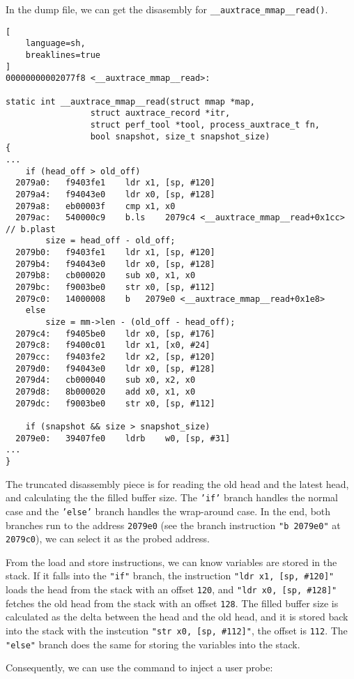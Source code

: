 \documentclass[11pt]{diazessay} %
\def\code#1{\texttt{#1}}
\begin{document}
In the dump file, we can get the disasembly for \code{\_\_auxtrace\_mmap\_\_read()}.

\begin{lstlisting}[
  	language=sh,
	breaklines=true
]
00000000002077f8 <__auxtrace_mmap__read>:

static int __auxtrace_mmap__read(struct mmap *map,
				 struct auxtrace_record *itr,
				 struct perf_tool *tool, process_auxtrace_t fn,
				 bool snapshot, size_t snapshot_size)
{
...
	if (head_off > old_off)
  2079a0:	f9403fe1 	ldr	x1, [sp, #120]
  2079a4:	f94043e0 	ldr	x0, [sp, #128]
  2079a8:	eb00003f 	cmp	x1, x0
  2079ac:	540000c9 	b.ls	2079c4 <__auxtrace_mmap__read+0x1cc>  // b.plast
		size = head_off - old_off;
  2079b0:	f9403fe1 	ldr	x1, [sp, #120]
  2079b4:	f94043e0 	ldr	x0, [sp, #128]
  2079b8:	cb000020 	sub	x0, x1, x0
  2079bc:	f9003be0 	str	x0, [sp, #112]
  2079c0:	14000008 	b	2079e0 <__auxtrace_mmap__read+0x1e8>
	else
		size = mm->len - (old_off - head_off);
  2079c4:	f9405be0 	ldr	x0, [sp, #176]
  2079c8:	f9400c01 	ldr	x1, [x0, #24]
  2079cc:	f9403fe2 	ldr	x2, [sp, #120]
  2079d0:	f94043e0 	ldr	x0, [sp, #128]
  2079d4:	cb000040 	sub	x0, x2, x0
  2079d8:	8b000020 	add	x0, x1, x0
  2079dc:	f9003be0 	str	x0, [sp, #112]

	if (snapshot && size > snapshot_size)
  2079e0:	39407fe0 	ldrb	w0, [sp, #31]
...
}
\end{lstlisting}

The truncated disassembly piece is for reading the old head and the latest
head, and calculating the the filled buffer size. The \code{'if'} branch
handles the normal case and the \code{'else'} branch handles the wrap-around
case. In the end, both branches run to the address \code{2079e0} (see the
branch instruction \code{"b 2079e0"} at \code{2079c0}), we can select it as
the probed address.

From the load and store instructions, we can know variables are stored in the
stack. If it falls into the \code{"if"} branch, the instruction
\code{"ldr x1, [sp, \#120]"} loads the head from the stack with an offset
\code{120}, and \code{"ldr x0, [sp, \#128]"} fetches the old head from the
stack with an offset \code{128}. The filled buffer size is calculated as the
delta between the head and the old head, and it is stored back into the stack
with the instcution \code{"str x0, [sp, \#112]"}, the offset is \code{112}.
The \code{"else"} branch does the same for storing the variables into the
stack.

Consequently, we can use the command to inject a user probe:
\end{document}
